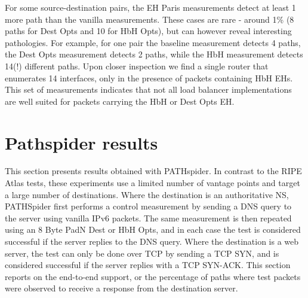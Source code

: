 \documentclass[conference]{IEEEtran}
\begin{document}
For some source-destination pairs, the EH Paris measurements detect at least 1 more path than the vanilla measurements. These cases are rare - around 1\% (8 paths for Dest Opts and 10 for HbH Opts), but can however reveal interesting pathologies.
For example, for one pair the baseline measurement detects 4 paths, the Dest Opts measurement detects 2 paths, while the HbH measurement detects 14(!) different paths. Upon closer inspection we find a single router that enumerates 14 interfaces, only in the presence of packets containing HbH EHs.
This set of measurements indicates that not all load balancer implementations are well suited for packets carrying the HbH or Dest Opts EH.


\section{Pathspider results} 
\label{sec:pathspider-results}

This section presents results obtained with PATHspider. In contrast to the RIPE Atlas tests, these experiments use a limited number of vantage points and target a large number of destinations. Where the destination is an authoritative NS, PATHSpider first performs a control measurement by sending a DNS query to the server using vanilla IPv6 packets. The same measurement is then repeated using an 8 Byte PadN Dest or HbH Opts, and in each case the test is considered successful if the server replies to the DNS query. Where the destination is a web server, the test can only be done over TCP by sending a TCP SYN, and is considered successful if the server replies with a TCP SYN-ACK.
This section reports on the end-to-end support, or the percentage of paths where test packets were observed to receive a response from the destination server.
\end{document}
